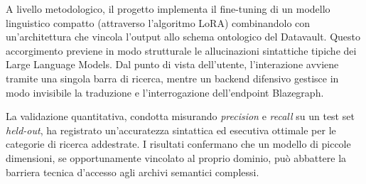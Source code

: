 \documentclass[12pt,a4paper,oneside]{book}
\begin{document}
A livello metodologico, il progetto implementa il fine-tuning di un modello linguistico compatto (attraverso l'algoritmo LoRA) combinandolo con un'architettura che vincola l'output allo schema ontologico del Datavault. Questo accorgimento previene in modo strutturale le allucinazioni sintattiche tipiche dei Large Language Models. Dal punto di vista dell'utente, l'interazione avviene tramite una singola barra di ricerca, mentre un backend difensivo gestisce in modo invisibile la traduzione e l'interrogazione dell'endpoint Blazegraph.

La validazione quantitativa, condotta misurando \textit{precision} e \textit{recall} su un test set \textit{held-out}, ha registrato un'accuratezza sintattica ed esecutiva ottimale per le categorie di ricerca addestrate. I risultati confermano che un modello di piccole dimensioni, se opportunamente vincolato al proprio dominio, può abbattere la barriera tecnica d'accesso agli archivi semantici complessi.


\topmargin=-2cm
\tableofcontents

\newpage
\begingroup
    \let\cleardoublepage\relax

    \clearpage
    \listoffigures

    \clearpage
    \listoftables
    
    \clearpage
    \lstlistoflistings\endgroup
\newpage~\newpage



\restoregeometry{}
\setcounter{page}{1}
\raggedbottom\pagestyle{plain}



\setcounter{chapter}{0}  %







\end{document}
